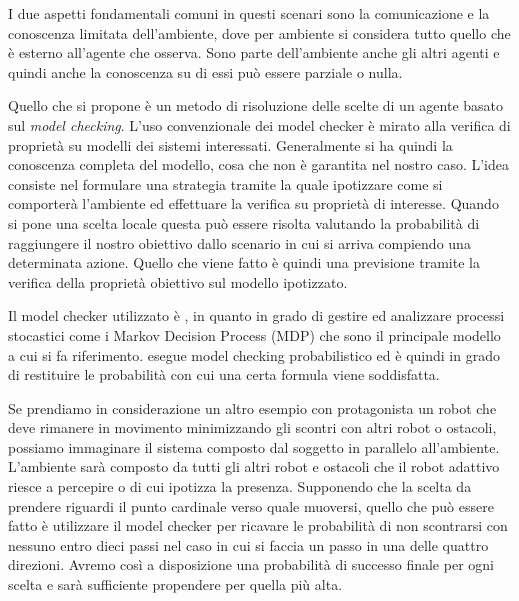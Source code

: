 I due aspetti fondamentali comuni in questi scenari sono la comunicazione e la conoscenza limitata dell'ambiente, dove per ambiente si considera tutto quello che è esterno all'agente che osserva. Sono parte dell'ambiente anche gli altri agenti e quindi anche la conoscenza su di essi può essere parziale o nulla.

Quello che si propone è un metodo di risoluzione delle scelte di un agente basato sul \emph{model checking}. L'uso convenzionale dei model checker è mirato alla verifica di proprietà su modelli dei sistemi interessati. Generalmente si ha quindi la conoscenza completa del modello, cosa che non è garantita nel nostro caso. L'idea consiste nel formulare una strategia tramite la quale ipotizzare come si comporterà l'ambiente ed effettuare la verifica su proprietà di interesse. Quando si pone una scelta locale questa può essere risolta valutando la probabilità di raggiungere il nostro obiettivo dallo scenario in cui si arriva compiendo una determinata azione. Quello che viene fatto è quindi una previsione tramite la verifica della proprietà obiettivo sul modello ipotizzato.

Il model checker utilizzato è \prism{}, %
in quanto in grado di gestire ed analizzare processi stocastici come i Markov Decision Process (MDP) che sono il principale modello a cui si fa riferimento. \prism{} esegue model checking probabilistico ed è quindi in grado di restituire le probabilità con cui una certa formula viene soddisfatta.

Se prendiamo in considerazione un altro esempio con protagonista un robot che deve rimanere in movimento minimizzando gli scontri con altri robot o ostacoli, possiamo immaginare il sistema composto dal soggetto in parallelo all'ambiente. L'ambiente sarà composto da tutti gli altri robot e ostacoli che il robot adattivo riesce a percepire o di cui ipotizza la presenza. Supponendo che la scelta da prendere riguardi il punto cardinale verso quale muoversi, quello che può essere fatto è utilizzare il model checker per ricavare le probabilità di non scontrarsi con nessuno entro dieci passi nel caso in cui si faccia un passo in una delle quattro direzioni. Avremo così a disposizione una probabilità di successo finale per ogni scelta e sarà sufficiente propendere per quella più alta.

